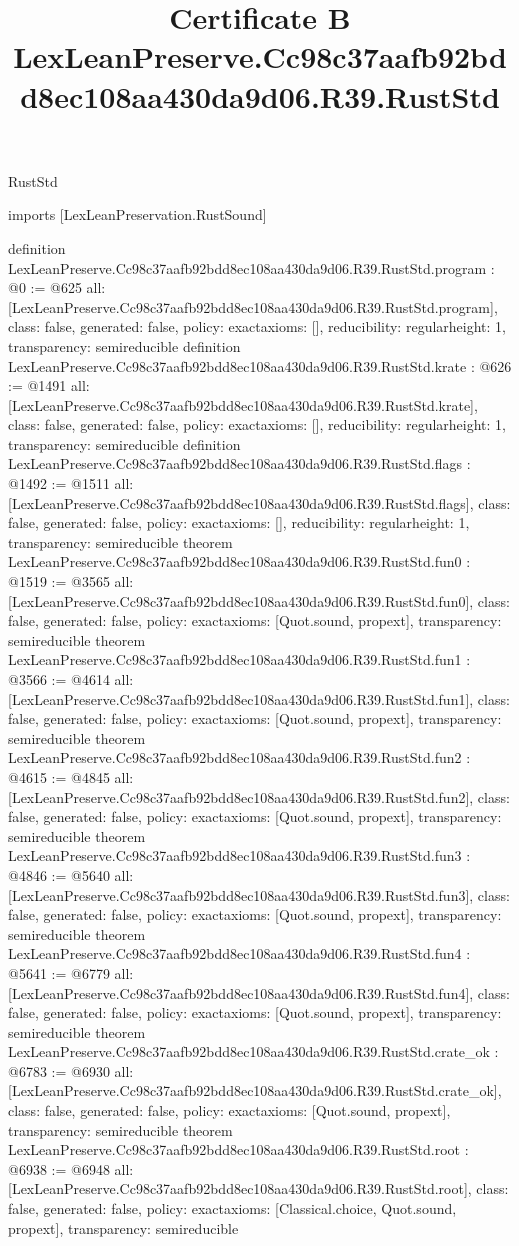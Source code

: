 \begin{lexlean}{RustStd}
\title{Certificate B LexLeanPreserve.Cc98c37aafb92bdd8ec108aa430da9d06.R39.RustStd}
\begin{coremodule}
imports [LexLeanPreservation.RustSound]

definition LexLeanPreserve.Cc98c37aafb92bdd8ec108aa430da9d06.R39.RustStd.program : @0 := @625 {
  all: [LexLeanPreserve.Cc98c37aafb92bdd8ec108aa430da9d06.R39.RustStd.program],
  class: false,
  generated: false,
  policy: exact{axioms: []},
  reducibility: regular{height: 1},
  transparency: semireducible
}
definition LexLeanPreserve.Cc98c37aafb92bdd8ec108aa430da9d06.R39.RustStd.krate : @626 := @1491 {
  all: [LexLeanPreserve.Cc98c37aafb92bdd8ec108aa430da9d06.R39.RustStd.krate],
  class: false,
  generated: false,
  policy: exact{axioms: []},
  reducibility: regular{height: 1},
  transparency: semireducible
}
definition LexLeanPreserve.Cc98c37aafb92bdd8ec108aa430da9d06.R39.RustStd.flags : @1492 := @1511 {
  all: [LexLeanPreserve.Cc98c37aafb92bdd8ec108aa430da9d06.R39.RustStd.flags],
  class: false,
  generated: false,
  policy: exact{axioms: []},
  reducibility: regular{height: 1},
  transparency: semireducible
}
theorem LexLeanPreserve.Cc98c37aafb92bdd8ec108aa430da9d06.R39.RustStd.fun0 : @1519 := @3565 {
  all: [LexLeanPreserve.Cc98c37aafb92bdd8ec108aa430da9d06.R39.RustStd.fun0],
  class: false,
  generated: false,
  policy: exact{axioms: [Quot.sound, propext]},
  transparency: semireducible
}
theorem LexLeanPreserve.Cc98c37aafb92bdd8ec108aa430da9d06.R39.RustStd.fun1 : @3566 := @4614 {
  all: [LexLeanPreserve.Cc98c37aafb92bdd8ec108aa430da9d06.R39.RustStd.fun1],
  class: false,
  generated: false,
  policy: exact{axioms: [Quot.sound, propext]},
  transparency: semireducible
}
theorem LexLeanPreserve.Cc98c37aafb92bdd8ec108aa430da9d06.R39.RustStd.fun2 : @4615 := @4845 {
  all: [LexLeanPreserve.Cc98c37aafb92bdd8ec108aa430da9d06.R39.RustStd.fun2],
  class: false,
  generated: false,
  policy: exact{axioms: [Quot.sound, propext]},
  transparency: semireducible
}
theorem LexLeanPreserve.Cc98c37aafb92bdd8ec108aa430da9d06.R39.RustStd.fun3 : @4846 := @5640 {
  all: [LexLeanPreserve.Cc98c37aafb92bdd8ec108aa430da9d06.R39.RustStd.fun3],
  class: false,
  generated: false,
  policy: exact{axioms: [Quot.sound, propext]},
  transparency: semireducible
}
theorem LexLeanPreserve.Cc98c37aafb92bdd8ec108aa430da9d06.R39.RustStd.fun4 : @5641 := @6779 {
  all: [LexLeanPreserve.Cc98c37aafb92bdd8ec108aa430da9d06.R39.RustStd.fun4],
  class: false,
  generated: false,
  policy: exact{axioms: [Quot.sound, propext]},
  transparency: semireducible
}
theorem LexLeanPreserve.Cc98c37aafb92bdd8ec108aa430da9d06.R39.RustStd.crate_ok : @6783 := @6930 {
  all: [LexLeanPreserve.Cc98c37aafb92bdd8ec108aa430da9d06.R39.RustStd.crate_ok],
  class: false,
  generated: false,
  policy: exact{axioms: [Quot.sound, propext]},
  transparency: semireducible
}
theorem LexLeanPreserve.Cc98c37aafb92bdd8ec108aa430da9d06.R39.RustStd.root : @6938 := @6948 {
  all: [LexLeanPreserve.Cc98c37aafb92bdd8ec108aa430da9d06.R39.RustStd.root],
  class: false,
  generated: false,
  policy: exact{axioms: [Classical.choice, Quot.sound, propext]},
  transparency: semireducible
}


\end{coremodule}
\end{lexlean}
